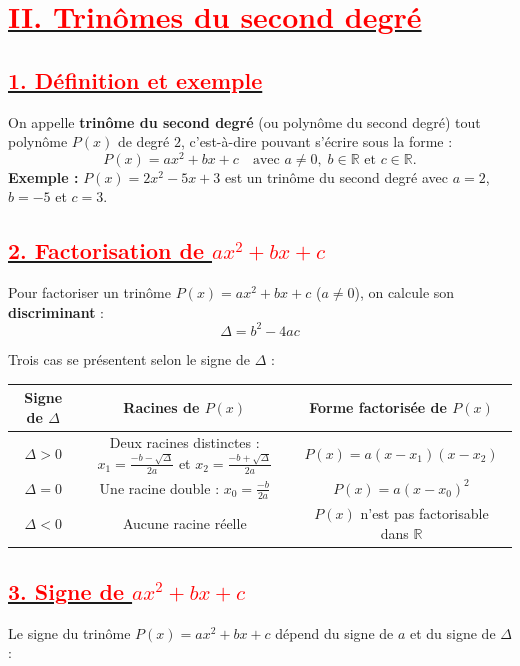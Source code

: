 \documentclass[12pt,a4paper]{article}
\newcounter{exemple}
\begin{document}
\section*{\underline{\textbf{\textcolor{red}{II. Trinômes du second degré }}}}

\subsection*{\underline{\textbf{\textcolor{red}{1. Définition et exemple}}}} 
On appelle \textbf{trinôme du second degré} (ou polynôme du second degré) tout polynôme $P(x)$ de degré $2$, c'est-à-dire pouvant s'écrire sous la forme :
$$P(x) = ax^2 + bx + c \quad \text{avec } a \neq 0, \; b \in \mathbb{R} \text{ et } c \in \mathbb{R}.$$
\textbf{Exemple :} $P(x) = 2x^2 - 5x + 3$ est un trinôme du second degré avec $a = 2$, $b = -5$ et $c = 3$.

\subsection*{\underline{\textbf{\textcolor{red}{2. Factorisation de $ax^{2}+bx+c$}}}} 
Pour factoriser un trinôme $P(x) = ax^2 + bx + c$ ($a \neq 0$), on calcule son \textbf{discriminant} :
$$\Delta = b^2 - 4ac$$

Trois cas se présentent selon le signe de $\Delta$ :

\begin{center}
\renewcommand{\arraystretch}{1.6}
\begin{tabular}{|c|c|c|}
\hline
\textbf{Signe de $\Delta$} & \textbf{Racines de $P(x)$} & \textbf{Forme factorisée de $P(x)$} \\
\hline
$\Delta > 0$ & Deux racines distinctes : $x_1 = \frac{-b - \sqrt{\Delta}}{2a}$ et $x_2 = \frac{-b + \sqrt{\Delta}}{2a}$ & $P(x) = a(x - x_1)(x - x_2)$ \\
\hline
$\Delta = 0$ & Une racine double : $x_0 = \frac{-b}{2a}$ & $P(x) = a(x - x_0)^2$ \\
\hline
$\Delta < 0$ & Aucune racine réelle & $P(x)$ n'est pas factorisable dans $\mathbb{R}$ \\
\hline
\end{tabular}
\end{center}

\subsection*{\underline{\textbf{\textcolor{red}{3. Signe de $ax^{2}+bx+c$}}}}
Le signe du trinôme $P(x) = ax^2 + bx + c$ dépend du signe de $a$ et du signe de $\Delta$ :
\end{document}
